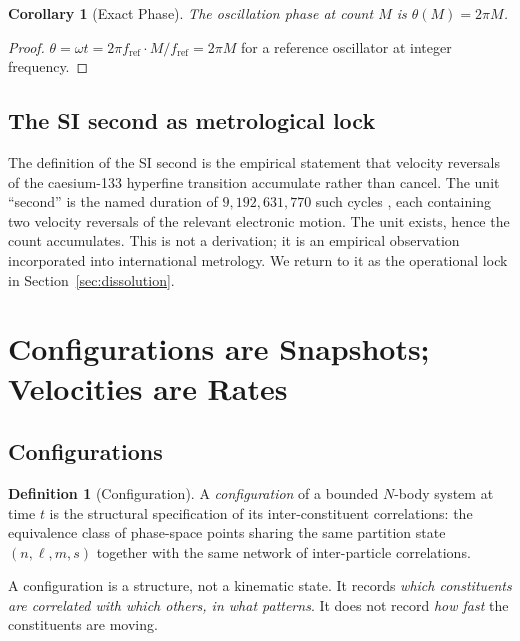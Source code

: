 \documentclass[twocolumn,10pt,a4paper]{article}
\theoremstyle{thmstyle}
\newtheorem{corollary}[theorem]{Corollary}
\theoremstyle{definition}
\newtheorem{definition}[theorem]{Definition}
\theoremstyle{remark}
\begin{document}
\begin{corollary}[Exact Phase]
\label{cor:phase}
The oscillation phase at count $M$ is $\theta(M)=2\pi M$.
\end{corollary}

\begin{proof}
$\theta=\omega t=2\pi f_{\mathrm{ref}}\cdot M/f_{\mathrm{ref}}=2\pi M$
for a reference oscillator at integer frequency.
\end{proof}

\subsection{The SI second as metrological lock}

The definition of the SI second is the empirical statement that
velocity reversals of the caesium-133 hyperfine transition accumulate
rather than cancel. The unit ``second'' is the named duration of
$9{,}192{,}631{,}770$ such cycles \citep{si2019}, each containing two
velocity reversals of the relevant electronic motion. The unit
exists, hence the count accumulates. This is not a derivation; it is
an empirical observation incorporated into international metrology.
We return to it as the operational lock in Section~\ref{sec:dissolution}.

\section{Configurations are Snapshots; Velocities are Rates}
\label{sec:configuration}

\subsection{Configurations}

\begin{definition}[Configuration]
\label{def:config}
A \emph{configuration} of a bounded $N$-body system at time $t$ is
the structural specification of its inter-constituent correlations:
the equivalence class of phase-space points sharing the same
partition state $(n,\ell,m,s)$ together with the same network of
inter-particle correlations.
\end{definition}

A configuration is a structure, not a kinematic state. It records
\emph{which constituents are correlated with which others, in what
patterns}. It does not record \emph{how fast} the constituents are
moving.
\end{document}
